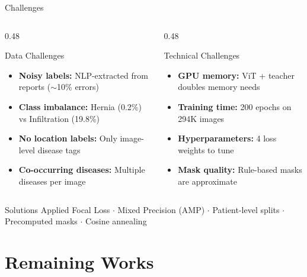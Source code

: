 \documentclass{beamer}
\begin{document}
\begin{frame}{Challenges}
\begin{columns}[T]
\begin{column}{0.48\textwidth}
\begin{block}{Data Challenges}
\begin{itemize}
    \item \textbf{Noisy labels:} NLP-extracted from reports ($\sim$10\% errors)
    \item \textbf{Class imbalance:} Hernia (0.2\%) vs Infiltration (19.8\%)
    \item \textbf{No location labels:} Only image-level disease tags
    \item \textbf{Co-occurring diseases:} Multiple diseases per image
\end{itemize}
\end{block}
\end{column}
\begin{column}{0.48\textwidth}
\begin{block}{Technical Challenges}
\begin{itemize}
    \item \textbf{GPU memory:} ViT + teacher doubles memory needs
    \item \textbf{Training time:} 200 epochs on 294K images
    \item \textbf{Hyperparameters:} 4 loss weights to tune
    \item \textbf{Mask quality:} Rule-based masks are approximate
\end{itemize}
\end{block}
\end{column}
\end{columns}
\vspace{6pt}
\begin{block}{Solutions Applied}
Focal Loss $\cdot$ Mixed Precision (AMP) $\cdot$ Patient-level splits $\cdot$ Precomputed masks $\cdot$ Cosine annealing
\end{block}
\end{frame}


\section{Remaining Works}
\end{document}

